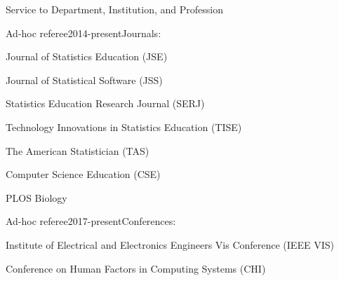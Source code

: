 \documentclass{resume} %
\begin{document}
\begin{rSection}{Service to Department, Institution, and Profession}
\begin{rSubsection}{Ad-hoc referee}{}{2014-present}{Journals:}
\item Journal of Statistics Education (JSE)
\item Journal of Statistical Software (JSS)
\item Statistics Education Research Journal (SERJ)
\item Technology Innovations in Statistics Education (TISE)
\item The American Statistician (TAS)
\item Computer Science Education (CSE)
\item PLOS Biology 
\end{rSubsection}

\begin{rSubsection}{Ad-hoc referee}{}{2017-present}{Conferences: }
\item Institute of Electrical and Electronics Engineers Vis Conference (IEEE VIS)
\item Conference on Human Factors in Computing Systems (CHI)
\end{rSubsection}

\end{rSection}

\end{document}
